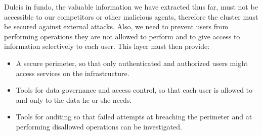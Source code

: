 Dulcis in fundo, the valuable information we have extracted thus far, must not be accessible to our competitors or other malicious agents, therefore the cluster must be secured against external attacks.\newline
Also, we need to prevent users from performing operations they are not allowed to perform and to give access to information selectively to each user.
This layer must then provide:
\begin{itemize}
	\item A secure perimeter, so that only authenticated and authorized users might access services on the infrastructure.
	\item Tools for data governance and access control, so that each user is allowed to and only to the data he or she needs.
	\item Tools for auditing so that failed attempts at breaching the perimeter and at performing disallowed operations can be investigated.
\end{itemize}